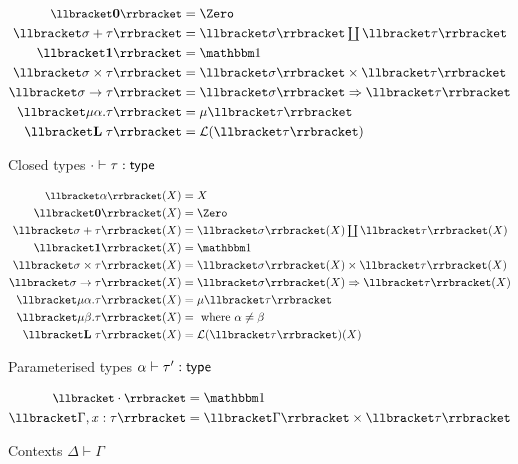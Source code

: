 \begin{figure}
\begin{subfigure}{\linewidth}
  \begin{align*}
  \small
  \sem{\tyZero} &= \Zero
  \\
  \sem{\sigma \tySum \tau} &= \textstyle {\sem{\sigma}} \coprod {\sem{\tau}}
  \\
  \sem{\tyUnit} &= \One
  \\
  \sem{\sigma \tyProd \tau} &= \sem{\sigma} \times \sem{\tau}
  \\
  \sem{\sigma \tyFun \tau} &= \internalHom{\sem{\sigma}}{\sem{\tau}}
  \\
  \sem{\mu\alpha.\tau} &= \mu\sem{\tau}
  \\
  \sem{\tyLift\;\tau} &= \mathcal{L}(\sem{\tau})
  \end{align*}
  \caption{Closed types $\cdot \vdash \tau: \mathsf{type}$}
\end{subfigure}
\begin{subfigure}{\linewidth}
  \begin{align*}
  \small
  \sem{\alpha}(X) &= X
  \\
  \sem{\tyZero}(X) &= \Zero
  \\
  \sem{\sigma \tySum \tau}(X) &= \textstyle {\sem{\sigma}(X)} \coprod {\sem{\tau}(X)}
  \\
  \sem{\tyUnit}(X) &= \One
  \\
  \sem{\sigma \tyProd \tau}(X) &= \sem{\sigma}(X) \times \sem{\tau}(X)
  \\
  \sem{\sigma \tyFun \tau}(X) &= \internalHom{\sem{\sigma}(X)}{\sem{\tau}(X)}
  \\
  \sem{\mu\alpha.\tau}(X) &= \mu\sem{\tau}
  \\
  \sem{\mu\beta.\tau}(X) &=
  \text{ where }\alpha \neq \beta
  \\
  \sem{\tyLift\;\tau}(X) &= \mathcal{L}(\sem{\tau})(X)
  \end{align*}
  \caption{Parameterised types $\alpha \vdash \tau': \mathsf{type}$}
  \label{fig:default-semantics:types}
\end{subfigure}
\begin{subfigure}{\linewidth}
  \begin{align*}
  \small
  \sem{\emptyCxt} &= \One
  \\
  \sem{\Gamma, x: \tau} &= \sem{\Gamma} \times \sem{\tau}
  \end{align*}
  \caption{Contexts $\Delta \vdash \Gamma$}
\end{subfigure}
\begin{subfigure}{\linewidth}

\end{subfigure}
\end{figure}
